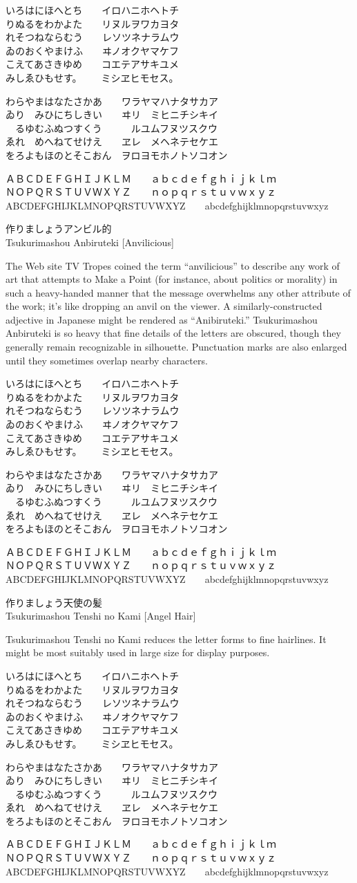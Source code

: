 \documentclass[14pt]{extarticle}
\newcommand{\iroha}{%
いろはにほへとち~~~~イロハニホヘトチ\\
りぬるをわかよた~~~~リヌルヲワカヨタ\\
れそつねならむう~~~~レソツネナラムウ\\
ゐのおくやまけふ~~~~ヰノオクヤマケフ\\
こえてあさきゆめ~~~~コエテアサキユメ\\
みしゑひもせす。~~~~ミシヱヒモセス。\par
}
\newcommand{\gojuuonzu}{%
わらやまはなたさかあ~~~~ワラヤマハナタサカア\\
ゐり~~みひにちしきい~~~~ヰリ~~ミヒニチシキイ\\
~~るゆむふぬつすくう~~~~~~ルユムフヌツスクウ\\
ゑれ~~めへねてせけえ~~~~ヱレ~~メヘネテセケエ\\
をろよもほのとそこおん~~ヲロヨモホノトソコオン\par
}
\begin{document}
\marumono
\iroha
\gojuuonzu

ＡＢＣＤＥＦＧＨＩＪＫＬＭ~~~~ａｂｃｄｅｆｇｈｉｊｋｌｍ\\
ＮＯＰＱＲＳＴＵＶＷＸＹＺ~~~~ｎｏｐｑｒｓｔｕｖｗｘｙｚ\\
ABCDEFGHIJKLMNOPQRSTUVWXYZ~~~~abcdefghijklmnopqrstuvwxyz

\clearpage


\anbiruteki

\Large
作りましょうアンビル的\\
Tsukurimashou Anbiruteki [Anvilicious]

\normalsize

The Web site TV Tropes coined the term ``anvilicious'' to describe any work
of art that attempts to Make a Point (for instance, about politics or
morality) in such a heavy-handed manner that the message overwhelms any
other attribute of the work; it's like dropping an anvil on the viewer.  A
similarly-constructed adjective in Japanese might be rendered as
``Anibiruteki.'' Tsukurimashou Anbiruteki is so heavy that fine details of
the letters are obscured, though they generally remain recognizable in
silhouette.  Punctuation marks are also enlarged until they sometimes
overlap nearby characters.

\anbirutekimono
\iroha
\gojuuonzu

ＡＢＣＤＥＦＧＨＩＪＫＬＭ~~~~ａｂｃｄｅｆｇｈｉｊｋｌｍ\\
ＮＯＰＱＲＳＴＵＶＷＸＹＺ~~~~ｎｏｐｑｒｓｔｕｖｗｘｙｚ\\
ABCDEFGHIJKLMNOPQRSTUVWXYZ~~~~abcdefghijklmnopqrstuvwxyz

\clearpage


\tenshinokami

\Large
作りましょう天使の髪\\
Tsukurimashou Tenshi no Kami [Angel Hair]

\normalsize

Tsukurimashou Tenshi no Kami reduces the letter forms to fine hairlines.  It
might be most suitably used in large size for display purposes.

\tenshinokamimono
\iroha
\gojuuonzu

ＡＢＣＤＥＦＧＨＩＪＫＬＭ~~~~ａｂｃｄｅｆｇｈｉｊｋｌｍ\\
ＮＯＰＱＲＳＴＵＶＷＸＹＺ~~~~ｎｏｐｑｒｓｔｕｖｗｘｙｚ\\
ABCDEFGHIJKLMNOPQRSTUVWXYZ~~~~abcdefghijklmnopqrstuvwxyz
\end{document}
